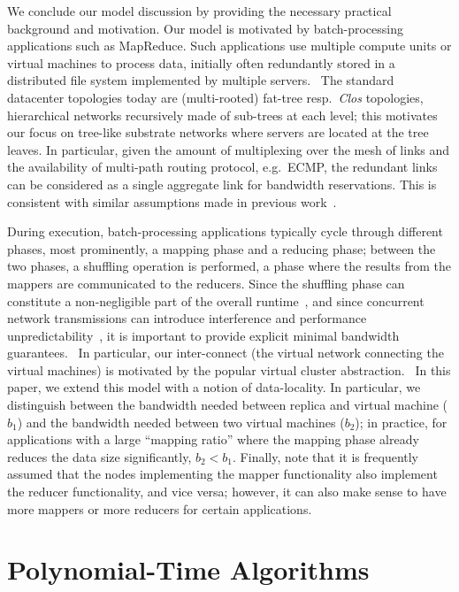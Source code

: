 \documentclass[9pt]{sigcomm-alternate}
\newcommand{\CostTrans}{\ensuremath{b_1}}
\newcommand{\CostCom}{\ensuremath{b_2}}
\begin{document}
We conclude our model discussion by providing the necessary practical background and motivation.
Our model is motivated by batch-processing applications such as MapReduce.
Such applications use multiple compute units or virtual machines to
process data, initially often redundantly stored in a distributed file system implemented
by multiple servers.~\cite{mapreduce}
The standard datacenter topologies today are (multi-rooted) fat-tree resp.~\emph{Clos} topologies,~\cite{vl2,fattree}
hierarchical networks  recursively made of sub-trees at each level; this motivates our
focus on tree-like substrate networks where servers are located at the
tree leaves. In particular, given the amount of multiplexing over the mesh of links
and the availability of multi-path routing protocol, e.g.~ECMP, the redundant
links can be considered as a single aggregate link for bandwidth
reservations. This is consistent with similar assumptions made in
previous work~\cite{oktopus,proteus}.

During execution, batch-processing applications typically cycle through different phases,
most prominently, a mapping phase and a reducing phase; between the two phases,
a shuffling operation is performed, a phase where the results from the mappers
are communicated to the reducers. Since the shuffling phase can constitute a
non-negligible part of the overall runtime~\cite{orchestra},
and since concurrent network transmissions can introduce interference and
performance unpredictability~\cite{amazonbw}, it is important
to provide explicit minimal bandwidth guarantees.~\cite{talk-about}
In particular, our inter-connect (the virtual network connecting the virtual machines)
is motivated by the popular virtual cluster abstraction.~\cite{oktopus,talk-about,proteus}
In this paper, we extend this model with a notion of data-locality.
In particular, we distinguish between the bandwidth needed between replica
and virtual machine ($\CostTrans$) and the bandwidth needed between
two virtual machines ($\CostCom$); in practice, for applications with a large
``mapping ratio'' where the mapping phase already reduces the data size significantly,
$\CostCom<\CostTrans$. Finally, note that it is frequently assumed
that the nodes implementing the mapper functionality also implement the reducer functionality,
and vice versa; however, it can also make sense to have more mappers or more reducers for
certain applications.

\section{Polynomial-Time Algorithms}\label{sec:poly}
\end{document}
